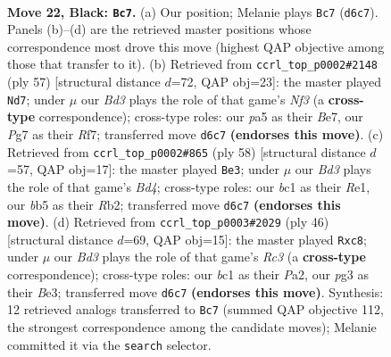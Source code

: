\documentclass[11pt]{article}
\begin{document}
\clearpage

\begin{figure}[p]\centering
\begin{subfigure}{0.46\textwidth}\centering
\resizebox{\linewidth}{!}{%
\newchessgame
\chessboard[
  setfen={1rb4k/pp4pp/3b1n2/PB3p2/1n3P2/1P2P1P1/8/RNB2RK1 b - - 4 22},
  showmover=false,
  pgfstyle=straightmove, color=movearrow, markmove={d6-c7}
]}
\caption{}
\end{subfigure}\hfill
\begin{subfigure}{0.46\textwidth}\centering
\resizebox{\linewidth}{!}{%
\newchessgame
\chessboard[
  setfen={2b3k1/4brp1/p1p2n1p/8/2P1PP2/2N4P/1Pn3P1/2BR1RK1 b - - 0 29},
  showmover=false,
  pgfstyle=straightmove, color=movearrow, markmove={f6-d7}
]}
\caption{}
\end{subfigure}
\\[4pt]
\begin{subfigure}{0.46\textwidth}\centering
\resizebox{\linewidth}{!}{%
\newchessgame
\chessboard[
  setfen={r3r1k1/p2n1p2/2ppb1pp/8/P2BP2P/2K5/1RB2PP1/4R3 w - - 9 30},
  showmover=false,
  pgfstyle=straightmove, color=movearrow, markmove={d4-e3}
]}
\caption{}
\end{subfigure}\hfill
\begin{subfigure}{0.46\textwidth}\centering
\resizebox{\linewidth}{!}{%
\newchessgame
\chessboard[
  setfen={2rr2k1/3nbpp1/p3p2p/1p5P/3P4/2RNBP2/PP4P1/1K5R w - - 0 24},
  showmover=false,
  pgfstyle=straightmove, color=movearrow, markmove={c3-c8}
]}
\caption{}
\end{subfigure}
\caption{\textbf{Move 22, Black: \texttt{Bc7}.} (a) Our position; Melanie plays \texttt{Bc7} (\texttt{d6c7}). Panels (b)--(d) are the retrieved master positions whose correspondence most drove this move (highest QAP objective among those that transfer to it). (b) Retrieved from \texttt{ccrl\_top\_p0002\#2148} (ply 57) [structural distance $d$=72, QAP obj=23]: the master played \texttt{Nd7}; under $\mu$ our \emph{Bd3} plays the role of that game's \emph{Nf3} (a \textbf{cross-type} correspondence); cross-type roles: our \emph{p}a5 as their \emph{B}e7, our \emph{P}g7 as their \emph{R}f7; transferred move \texttt{d6c7} \textbf{(endorses this move)}. (c) Retrieved from \texttt{ccrl\_top\_p0002\#865} (ply 58) [structural distance $d$=57, QAP obj=17]: the master played \texttt{Be3}; under $\mu$ our \emph{Bd3} plays the role of that game's \emph{Bd4}; cross-type roles: our \emph{b}c1 as their \emph{R}e1, our \emph{b}b5 as their \emph{R}b2; transferred move \texttt{d6c7} \textbf{(endorses this move)}. (d) Retrieved from \texttt{ccrl\_top\_p0003\#2029} (ply 46) [structural distance $d$=69, QAP obj=15]: the master played \texttt{Rxc8}; under $\mu$ our \emph{Bd3} plays the role of that game's \emph{Rc3} (a \textbf{cross-type} correspondence); cross-type roles: our \emph{b}c1 as their \emph{P}a2, our \emph{p}g3 as their \emph{B}e3; transferred move \texttt{d6c7} \textbf{(endorses this move)}. Synthesis: 12 retrieved analogs transferred to \texttt{Bc7} (summed QAP objective 112, the strongest correspondence among the candidate moves); Melanie committed it via the \texttt{search} selector.}
\label{fig:thought-m43}
\end{figure}
\end{document}

